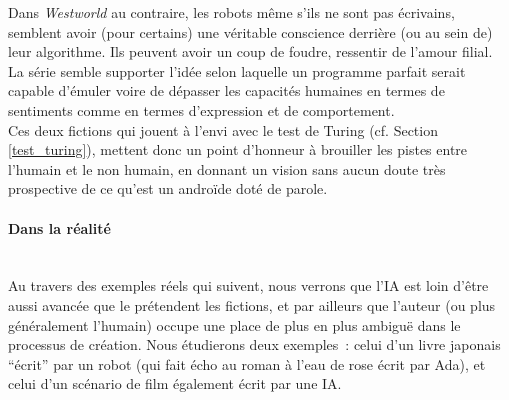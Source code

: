 \documentclass{article}
\newcommand{\subsubsubsection}[1]{\paragraph{#1}\mbox{}\\}
\begin{document}
					Dans \textit{Westworld} au contraire, les robots même s'ils ne sont pas écrivains, semblent avoir (pour certains) une véritable conscience derrière (ou au sein de) leur algorithme. Ils peuvent avoir un coup de foudre, ressentir de l'amour filial. La série semble supporter l'idée selon laquelle un programme parfait serait capable d'émuler voire de dépasser les capacités humaines en termes de sentiments comme en termes d'expression et de comportement.\\
					
					Ces deux fictions qui jouent à l'envi avec le test de Turing (cf. Section \ref{test_turing}), mettent donc un point d'honneur à brouiller les pistes entre l'humain et le non humain, en donnant un vision sans aucun doute très prospective de ce qu'est un androïde doté de parole.
					
					
					
				\subsubsubsection{Dans la réalité}
					Au travers des exemples réels qui suivent, nous verrons que l'IA est loin d'être aussi avancée que le prétendent les fictions, et par ailleurs que l'auteur (ou plus généralement l'humain) occupe une place de plus en plus ambiguë dans le processus de création. Nous étudierons deux exemples~: celui d'un livre japonais ``écrit'' par un robot (qui fait écho au roman à l'eau de rose écrit par Ada), et celui d'un scénario de film également écrit par une IA.\\
					
\end{document}
